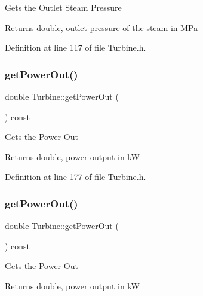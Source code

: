 Gets the Outlet Steam Pressure

\begin{DoxyReturn}{Returns}
double, outlet pressure of the steam in M\+Pa 
\end{DoxyReturn}


Definition at line 117 of file Turbine.\+h.

\mbox{\label{class_turbine_a89585cc2fbfdbe67d539eae08c369fa2}} 
\subsubsection{\texorpdfstring{get\+Power\+Out()}{getPowerOut()}\hspace{0.1cm}{\footnotesize\ttfamily [1/3]}}
{\footnotesize\ttfamily double Turbine\+::get\+Power\+Out (\begin{DoxyParamCaption}{ }\end{DoxyParamCaption}) const\hspace{0.3cm}{\ttfamily [inline]}}

Gets the Power Out

\begin{DoxyReturn}{Returns}
double, power output in kW 
\end{DoxyReturn}


Definition at line 177 of file Turbine.\+h.

\mbox{\label{class_turbine_a89585cc2fbfdbe67d539eae08c369fa2}} 
\subsubsection{\texorpdfstring{get\+Power\+Out()}{getPowerOut()}\hspace{0.1cm}{\footnotesize\ttfamily [2/3]}}
{\footnotesize\ttfamily double Turbine\+::get\+Power\+Out (\begin{DoxyParamCaption}{ }\end{DoxyParamCaption}) const\hspace{0.3cm}{\ttfamily [inline]}}

Gets the Power Out

\begin{DoxyReturn}{Returns}
double, power output in kW 
\end{DoxyReturn}


